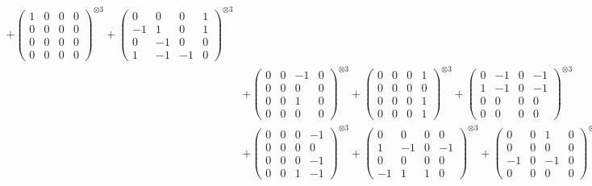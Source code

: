 \documentclass{article}
\begin{document}
{\begin{align}
            + \begin{pmatrix} 1 & 0 & 0 & 0 \\ 0 & 0 & 0 & 0 \\ 0 & 0 & 0 & 0 \\ 0 & 0 & 0 & 0 \end{pmatrix}^{\otimes 3} 
            + \begin{pmatrix} 0 & 0 & 0 & 1 \\ -1 & 1 & 0 & 1 \\ 0 & -1 & 0 & 0 \\ 1 & -1 & -1 & 0 \end{pmatrix}^{\otimes 3} \\
        &+ \label{Rs16-Rc11-Solution-22-c10} \begin{pmatrix} 0 & 0 & -1 & 0 \\ 0 & 0 & 0 & 0 \\ 0 & 0 & 1 & 0 \\ 0 & 0 & 0 & 0 \end{pmatrix}^{\otimes 3} 
            + \begin{pmatrix} 0 & 0 & 0 & 1 \\ 0 & 0 & 0 & 0 \\ 0 & 0 & 0 & 1 \\ 0 & 0 & 0 & 1 \end{pmatrix}^{\otimes 3} 
            + \begin{pmatrix} 0 & -1 & 0 & -1 \\ 1 & -1 & 0 & -1 \\ 0 & 0 & 0 & 0 \\ 0 & 0 & 0 & 0 \end{pmatrix}^{\otimes 3} \\
        &+ \label{Rs16-Rc11-Solution-22-c13} \begin{pmatrix} 0 & 0 & 0 & -1 \\ 0 & 0 & 0 & 0 \\ 0 & 0 & 0 & -1 \\ 0 & 0 & 1 & -1 \end{pmatrix}^{\otimes 3} 
            + \begin{pmatrix} 0 & 0 & 0 & 0 \\ 1 & -1 & 0 & -1 \\ 0 & 0 & 0 & 0 \\ -1 & 1 & 1 & 0 \end{pmatrix}^{\otimes 3} 
            + \begin{pmatrix} 0 & 0 & 1 & 0 \\ 0 & 0 & 0 & 0 \\ -1 & 0 & -1 & 0 \\ 0 & 0 & 0 & 0 \end{pmatrix}^{\otimes 3} \\

\end{align}}
\end{document}
